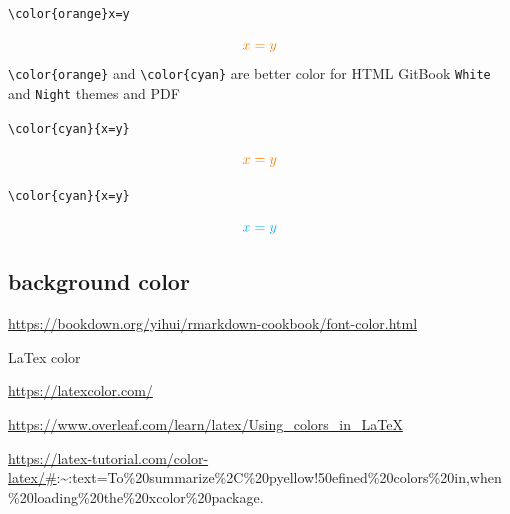 \documentclass[
]{book}
\newenvironment{Shaded}{\begin{snugshade}}{\end{snugshade}}
\newcommand{\NormalTok}[1]{#1}
\theoremstyle{definition}
\theoremstyle{definition}
\theoremstyle{definition}
\theoremstyle{definition}
\theoremstyle{remark}
\begin{document}
\texttt{\textbackslash{}color\{orange\}x=y}

\[\color{orange}x=y\]
\texttt{\textbackslash{}color\{orange\}} and \texttt{\textbackslash{}color\{cyan\}} are better color for HTML GitBook \texttt{White} and \texttt{Night} themes and PDF

\texttt{\textbackslash{}color\{cyan\}\{x=y\}}

\[\color{orange}{x=y}\]

\texttt{\textbackslash{}color\{cyan\}\{x=y\}}

\[\color{cyan}{x=y}\]

\begin{Shaded}
\end{Shaded}

\subsection{background color}\label{background-color}

\url{https://bookdown.org/yihui/rmarkdown-cookbook/font-color.html}

LaTex color

\url{https://latexcolor.com/}

\url{https://www.overleaf.com/learn/latex/Using_colors_in_LaTeX}

\url{https://latex-tutorial.com/color-latex/\#}:\textasciitilde:text=To\%20summarize\%2C\%20pyellow!50efined\%20colors\%20in,when\%20loading\%20the\%20xcolor\%20package.
\end{document}
